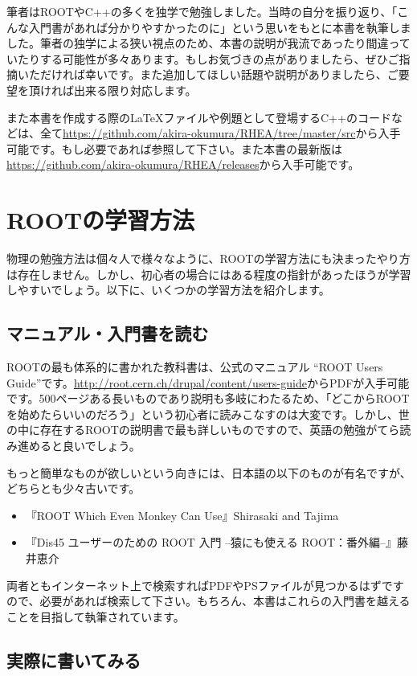 筆者はROOTやC++の多くを独学で勉強しました。当時の自分を振り返り、「こんな入門書があれば分かりやすかったのに」という思いをもとに本書を執筆しました。筆者の独学による狭い視点のため、本書の説明が我流であったり間違っていたりする可能性が多々あります。もしお気づきの点がありましたら、ぜひご指摘いただければ幸いです。また追加してほしい話題や説明がありましたら、ご要望を頂ければ出来る限り対応します。

また本書を作成する際の{\LaTeX}ファイルや例題として登場するC++のコードなどは、全て\url{https://github.com/akira-okumura/RHEA/tree/master/src}から入手可能です。もし必要であれば参照して下さい。また本書の最新版は\url{https://github.com/akira-okumura/RHEA/releases}から入手可能です。

\section{ROOTの学習方法}
物理の勉強方法は個々人で様々なように、ROOTの学習方法にも決まったやり方は存在しません。しかし、初心者の場合にはある程度の指針があったほうが学習しやすいでしょう。以下に、いくつかの学習方法を紹介します。
\subsection{マニュアル・入門書を読む}
ROOTの最も体系的に書かれた教科書は、公式のマニュアル ``ROOT Users Guide''です。\url{http://root.cern.ch/drupal/content/users-guide}からPDFが入手可能です。500ページある長いものであり説明も多岐にわたるため、「どこからROOTを始めたらいいのだろう」という初心者に読みこなすのは大変です。しかし、世の中に存在するROOTの説明書で最も詳しいものですので、英語の勉強がてら読み進めると良いでしょう。

もっと簡単なものが欲しいという向きには、日本語の以下のものが有名ですが、どちらとも少々古いです。
\begin{itemize}
  \item 『ROOT Which Even Monkey Can Use』Shirasaki and Tajima
  \item 『Dis45 ユーザーのための ROOT 入門 --猿にも使える ROOT：番外編--』藤井恵介
\end{itemize}
両者ともインターネット上で検索すればPDFやPSファイルが見つかるはずですので、必要があれば検索して下さい。もちろん、本書はこれらの入門書を越えることを目指して執筆されています。

\subsection{実際に書いてみる}

